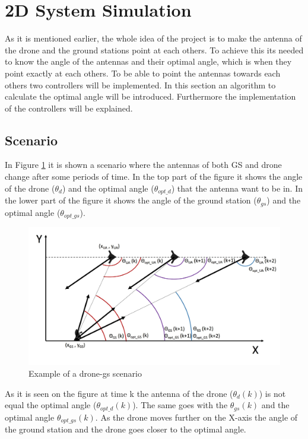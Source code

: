\newpage
\section{2D System Simulation}
As it is mentioned earlier, the whole idea of the project is to make the antenna of the drone and the ground stations point at each others. To achieve this its needed to know the angle of the antennas and their optimal angle, which is when they point exactly at each others. To be able to point the antennas towards each others two controllers will be implemented. In this section an algorithm to calculate the optimal angle will be introduced. Furthermore the implementation of the controllers will be explained.
\subsection{Scenario}
In Figure \ref{fig:drone_gs} it is shown a scenario where the antennas of both GS and drone change after some periods of time. In the top part of the figure it shows the angle of the drone ($\theta_{d}$) and the optimal angle ($\theta_{opt\_d}$) that the antenna want to be in. In the lower part of the figure it shows the angle of the ground station ($\theta_{gs}$) and the optimal angle ($\theta_{opt\_gs}$). 

\begin{figure}[h]
	\centering
	\includegraphics[scale=0.45]{figures/drone_gs_ex_1.jpg}
	\caption{Example of a drone-gs scenario}
	\label{fig:drone_gs}
\end{figure}

As it is seen on the figure at time k the antenna of the drone ($\theta_d (k)$) is not equal the optimal angle ($\theta_{opt\_d}(k)$). The same goes with the $\theta_{gs}(k)$ and the optimal angle $\theta_{opt\_gs}(k)$. As the drone moves further on the X-axis the angle of the ground station and the drone goes closer to the optimal angle. 

